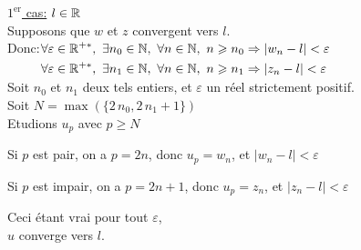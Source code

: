 \documentclass[12pt,twoside,a4paper]{article}
\begin{document}
		\begin{preuve}
			\underline{$1^{\text{er}}$ cas:} $l\in\mathbb{R}$\\
			Supposons que $w$ et $z$ convergent vers $l$.\\
			Donc:$\begin{aligned}[t]
			&\forall\varepsilon\in\R^{+*},\ \exists n_0\in\N,\ \forall n\in\N,\ n\geqslant n_0\Rightarrow |w_n-l|<\varepsilon\\
			&\forall\varepsilon\in\R^{+*},\ \exists n_1\in\N,\ \forall n\in\N,\ n\geqslant n_1\Rightarrow |z_n-l|<\varepsilon
			\end{aligned}$\\
			Soit $n_0$ et $n_1$ deux tels entiers, et $\varepsilon$ un r\'eel strictement positif.\\
			Soit $N=\max(\{2\,n_0,2\,n_1+1\})$\\
			Etudions $u_p$ avec $p\geqslant N$
			\begin{liste}
				\item Si $p$ est pair, on a $p=2n$, donc $u_p=w_n$, et $|w_n-l|<\varepsilon$
				\item Si $p$ est impair, on a $p=2n+1$, donc $u_p=z_n$, et $|z_n-l|<\varepsilon$
			\end{liste}
			Ceci \'etant vrai pour tout $\varepsilon$,\\
			$u$ converge vers $l$.
		\end{preuve}
\end{document}
